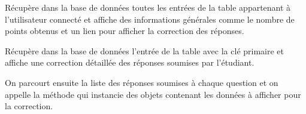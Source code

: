 \documentclass[a4,10pt,french]{sphinxmanual}
\begin{document}

\begin{fulllineitems}
\label{source:quiz.views.completed_quizzes}
Récupère dans la base de données toutes les entrées de la table 
appartenant à l'utilisateur connecté et affiche des informations générales comme
le nombre de points obtenus et un lien pour afficher la correction des réponses.

\end{fulllineitems}


\begin{fulllineitems}
\label{source:quiz.views.correct}
Récupère dans la base de données l'entrée de la table  avec
la clé primaire  et affiche une correction détaillée des réponses soumises
par l'étudiant.

On parcourt ensuite la liste des réponses soumises à chaque question et on appelle
la méthode  qui instancie des objets contenant les données
à afficher pour la correction.

\end{fulllineitems}

\end{document}
